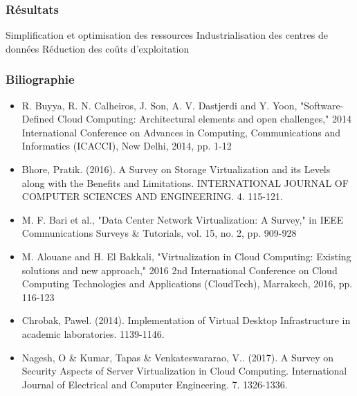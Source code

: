 \documentclass{beamer}
\begin{document}

\begin{frame}
\frametitle{Résultats}

Simplification et optimisation des ressources
\medbreak
\medbreak
Industrialisation des centres de données
\medbreak
\medbreak
Réduction des coûts d'exploitation

\end{frame}



\begin{frame}
\frametitle{Biliographie}
\begin{itemize}
    \fontsize{6pt}{7.2}\selectfont

    \item R. Buyya, R. N. Calheiros, J. Son, A. V. Dastjerdi and Y. Yoon, "Software-Defined Cloud Computing: Architectural elements and open challenges," 2014 International Conference on Advances in Computing, Communications and Informatics (ICACCI), New Delhi, 2014, pp. 1-12
    \item Bhore, Pratik. (2016). A Survey on Storage Virtualization and its Levels along with the Benefits and Limitations. INTERNATIONAL JOURNAL OF COMPUTER SCIENCES AND ENGINEERING. 4. 115-121.
    \item M. F. Bari et al., "Data Center Network Virtualization: A Survey," in IEEE Communications Surveys \& Tutorials, vol. 15, no. 2, pp. 909-928
    \item M. Alouane and H. El Bakkali, "Virtualization in Cloud Computing: Existing solutions and new approach," 2016 2nd International Conference on Cloud Computing Technologies and Applications (CloudTech), Marrakech, 2016, pp. 116-123
    \item Chrobak, Pawel. (2014). Implementation of Virtual Desktop Infrastructure in academic laboratories. 1139-1146.
    \item Nagesh, O \& Kumar, Tapas \& Venkateswararao, V.. (2017). A Survey on Security Aspects of Server Virtualization in Cloud Computing. International Journal of Electrical and Computer Engineering. 7. 1326-1336.
\end{itemize}

\end{frame}
\end{document}
